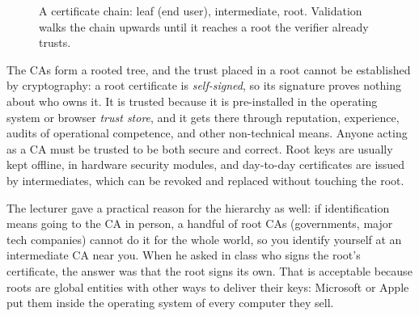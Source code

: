 \begin{figure}[H]
\centering
{}
\caption{A certificate chain: leaf (end user), intermediate, root. Validation walks the chain upwards until it reaches a root the verifier already trusts.}
\label{fig:cert-chain}
\end{figure}

The CAs form a rooted tree, and the trust placed in a root cannot be established by cryptography: a root certificate is \emph{self-signed}, so its signature proves nothing about who owns it. It is trusted because it is pre-installed in the operating system or browser \emph{trust store}, and it gets there through reputation, experience, audits of operational competence, and other non-technical means. Anyone acting as a CA must be trusted to be both secure and correct. Root keys are usually kept offline, in hardware security modules, and day-to-day certificates are issued by intermediates, which can be revoked and replaced without touching the root.

The lecturer gave a practical reason for the hierarchy as well: if identification means going to the CA in person, a handful of root CAs (governments, major tech companies) cannot do it for the whole world, so you identify yourself at an intermediate CA near you. When he asked in class who signs the root's certificate, the answer was that the root signs its own. That is acceptable because roots are global entities with other ways to deliver their keys: Microsoft or Apple put them inside the operating system of every computer they sell.

